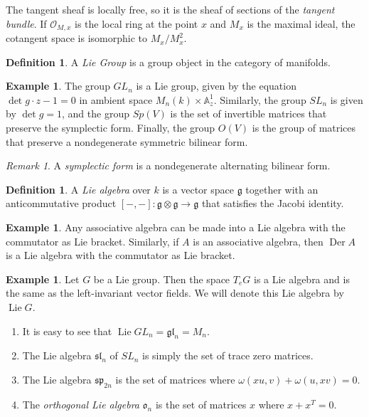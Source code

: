 \documentclass[leqno, openany]{memoir}
\theoremstyle{definition}
\newtheorem{defn}[thm]{Definition}
\newtheorem{exm}[thm]{Example}
\theoremstyle{remark}
\newtheorem{rmk}[thm]{Remark}
\theoremstyle{plain}
\theoremstyle{definition}
\theoremstyle{remark}
\newcommand{\A}{\mathbb{A}}
\newcommand{\mc}[1]{\mathcal{#1}}
\newcommand{\mf}[1]{\mathfrak{#1}}
\DeclareMathOperator{\Der}{Der}
\DeclareMathOperator{\Lie}{Lie}
\begin{document}
The tangent sheaf is locally free, so it is the sheaf of sections of the
\textit{tangent bundle}. If $\mc{O}_{M,x}$ is the local ring at the point $x$
and $M_x$ is the maximal ideal, the cotangent space is isomorphic to $M_x /
M_x^2$.

\begin{defn} A \textit{Lie Group} is a group object in the category of
manifolds.  \end{defn}

\begin{exm} The group $GL_n$ is a Lie group, given by the equation $\det g
    \cdot z - 1 = 0$ in ambient space $M_n(k) \times \A^1_{z}$. Similarly, the
    group $SL_n$ is given by $\det g = 1$, and the group $Sp(V)$ is the set of
    invertible matrices that preserve the symplectic form. Finally, the group
    $O(V)$ is the group of matrices that preserve a nondegenerate symmetric
    bilinear form.  \end{exm}

\begin{rmk} A \textit{symplectic form} is a nondegenerate alternating bilinear
form.  \end{rmk}

\begin{defn} A \textit{Lie algebra} over $k$ is a vector space $\mf{g}$
together with an anticommutative product $[-,-]: \mf{g} \otimes \mf{g} \to
\mf{g}$ that satisfies the Jacobi identity.  \end{defn}

\begin{exm} Any associative algebra can be made into a Lie algebra with the
commutator as Lie bracket. Similarly, if $A$ is an associative algebra, then
$\Der A$ is a Lie algebra with the commutator as Lie bracket.  \end{exm}

\begin{exm} Let $G$ be a Lie group. Then the space $T_e G$ is a Lie algebra and
    is the same as the left-invariant vector fields. We will denote this Lie
    algebra by $\operatorname{Lie} G$.  \begin{enumerate} \item It is easy to
        see that $\Lie GL_n = \mf{gl}_n = M_n$.  \item The Lie algebra
        $\mf{sl}_n$ of $SL_n$ is simply the set of trace zero matrices.  \item
        The Lie algebra $\mf{sp}_{2n}$ is the set of matrices where
        $\omega(xu,v) + \omega(u, xv) = 0$.  \item The \textit{orthogonal Lie
        algebra} $\mf{o}_n$ is the set of matrices $x$ where $x + x^T = 0$.
\end{enumerate} \end{exm}
\end{document}
